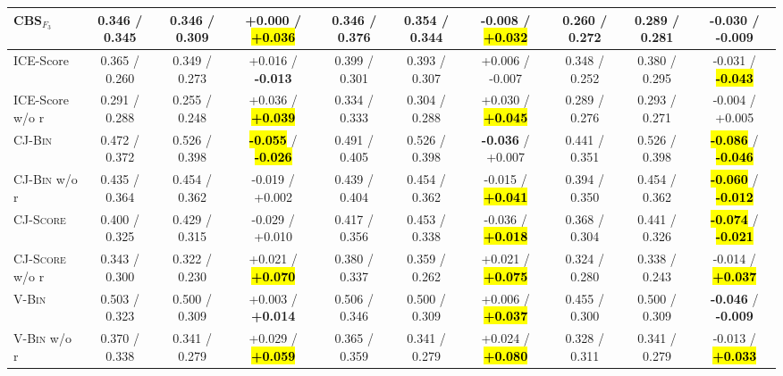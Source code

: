 \begin{table}[t]
\begin{tabular}{@{}
        l|ccc|ccc|ccc@{}}
        CBS$_{F_3}$             & 0.346 / 0.345   & 0.346 / 0.309   & +0.000 / \hl{\textbf{+0.036}}       & 0.346 / 0.376   & 0.354 / 0.344   & -0.008 / \hl{\textbf{+0.032}}       & 0.260 / 0.272   & 0.289 / 0.281   & \textbf{-0.030} / \textbf{-0.009}   \\
        \midrule
        \midrule
        ICE-Score               & 0.365 / 0.260   & 0.349 / 0.273   & +0.016 / \textbf{-0.013}            & 0.399 / 0.301   & 0.393 / 0.307   & +0.006 / -0.007                     & 0.348 / 0.252   & 0.380 / 0.295   & -0.031 / \hl{\textbf{-0.043}}       \\
        ICE-Score w/o r         & 0.291 / 0.288   & 0.255 / 0.248   & +0.036 / \hl{\textbf{+0.039}}       & 0.334 / 0.333   & 0.304 / 0.288   & +0.030 / \hl{\textbf{+0.045}}       & 0.289 / 0.276   & 0.293 / 0.271   & -0.004 / +0.005                     \\
        \midrule
        \textsc{CJ-Bin}         & 0.472 / 0.372   & 0.526 / 0.398   & \hl{\textbf{-0.055}} / \hl{\textbf{-0.026}} & 0.491 / 0.405   & 0.526 / 0.398   & \textbf{-0.036} / +0.007            & 0.441 / 0.351   & 0.526 / 0.398   & \hl{\textbf{-0.086}} / \hl{\textbf{-0.046}} \\
        \textsc{CJ-Bin} w/o r   & 0.435 / 0.364   & 0.454 / 0.362   & -0.019 / +0.002                     & 0.439 / 0.404   & 0.454 / 0.362   & -0.015 / \hl{\textbf{+0.041}}       & 0.394 / 0.350   & 0.454 / 0.362   & \hl{\textbf{-0.060}} / \hl{\textbf{-0.012}} \\
        \midrule
        \textsc{CJ-Score}       & 0.400 / 0.325   & 0.429 / 0.315   & -0.029 / +0.010                     & 0.417 / 0.356   & 0.453 / 0.338   & -0.036 / \hl{\textbf{+0.018}}       & 0.368 / 0.304   & 0.441 / 0.326   & \hl{\textbf{-0.074}} / \hl{\textbf{-0.021}} \\
        \textsc{CJ-Score} w/o r & 0.343 / 0.300   & 0.322 / 0.230   & +0.021 / \hl{\textbf{+0.070}}       & 0.380 / 0.337   & 0.359 / 0.262   & +0.021 / \hl{\textbf{+0.075}}       & 0.324 / 0.280   & 0.338 / 0.243   & -0.014 / \hl{\textbf{+0.037}}       \\
        \midrule
        \textsc{V-Bin}          & 0.503 / 0.323   & 0.500 / 0.309   & +0.003 / \textbf{+0.014}            & 0.506 / 0.346   & 0.500 / 0.309   & +0.006 / \hl{\textbf{+0.037}}       & 0.455 / 0.300   & 0.500 / 0.309   & \textbf{-0.046} / \textbf{-0.009}   \\
        \textsc{V-Bin} w/o r    & 0.370 / 0.338   & 0.341 / 0.279   & +0.029 / \hl{\textbf{+0.059}}       & 0.365 / 0.359   & 0.341 / 0.279   & +0.024 / \hl{\textbf{+0.080}}       & 0.328 / 0.311   & 0.341 / 0.279   & -0.013 / \hl{\textbf{+0.033}}       \\

\end{tabular}
\end{table}
